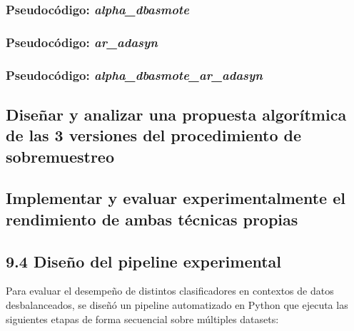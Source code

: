 \documentclass[12pt,a4paper]{article}
\begin{document}
\subsubsection{Pseudocódigo: \textit{alpha\_dbasmote}}


\subsubsection{Pseudocódigo: \textit{ar\_adasyn}}


\subsubsection{Pseudocódigo: \textit{alpha\_dbasmote\_ar\_adasyn}}











\subsection{Diseñar y analizar una propuesta algorítmica de las 3 versiones del procedimiento de sobremuestreo}

\subsection{Implementar y evaluar experimentalmente el rendimiento de ambas técnicas propias}


\subsection{9.4 Diseño del pipeline experimental}
\label{sec:pipeline_experimental}

Para evaluar el desempeño de distintos clasificadores en contextos de datos desbalanceados, se diseñó un pipeline automatizado en Python que ejecuta las siguientes etapas de forma secuencial sobre múltiples datasets:
\end{document}
